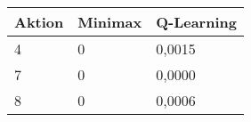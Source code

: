 \begin{tabular}{lll}
\toprule
Aktion  & Minimax & Q-Learning \\ \midrule
4	    & 0	                & 0,0015 \\
7   	& 0	                & 0,0000 \\
8	    & 0	                & 0,0006 \\ \bottomrule
\end{tabular}
